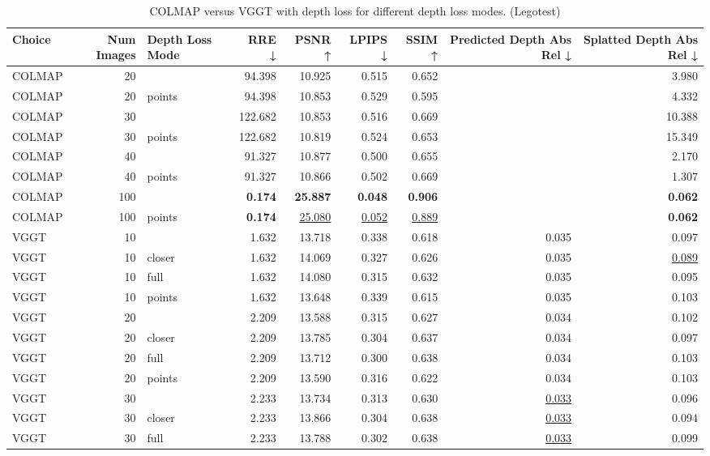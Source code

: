 \begin{table}[H]
\caption{COLMAP versus VGGT with depth loss for different depth loss modes. (Legotest)}
\label{tab:05_depth_loss_num_images_legotest}
\begin{tabular}{lrlrrrrrr}
\toprule
Choice & Num Images & Depth Loss Mode & RRE ↓ & PSNR ↑ & LPIPS ↓ & SSIM ↑ & Predicted Depth Abs Rel ↓ & Splatted Depth Abs Rel ↓ \\
\midrule
COLMAP & 20 &  & 94.398 & 10.925 & 0.515 & 0.652 &  & 3.980 \\
COLMAP & 20 & points & 94.398 & 10.853 & 0.529 & 0.595 &  & 4.332 \\
COLMAP & 30 &  & 122.682 & 10.853 & 0.516 & 0.669 &  & 10.388 \\
COLMAP & 30 & points & 122.682 & 10.819 & 0.524 & 0.653 &  & 15.349 \\
COLMAP & 40 &  & 91.327 & 10.877 & 0.500 & 0.655 &  & 2.170 \\
COLMAP & 40 & points & 91.327 & 10.866 & 0.502 & 0.669 &  & 1.307 \\
COLMAP & 100 &  & \textbf{0.174} & \textbf{25.887} & \textbf{0.048} & \textbf{0.906} &  & \textbf{0.062} \\
COLMAP & 100 & points & \textbf{0.174} & \underline{25.080} & \underline{0.052} & \underline{0.889} &  & \textbf{0.062} \\
VGGT & 10 &  & 1.632 & 13.718 & 0.338 & 0.618 & 0.035 & 0.097 \\
VGGT & 10 & closer & 1.632 & 14.069 & 0.327 & 0.626 & 0.035 & \underline{0.089} \\
VGGT & 10 & full & 1.632 & 14.080 & 0.315 & 0.632 & 0.035 & 0.095 \\
VGGT & 10 & points & 1.632 & 13.648 & 0.339 & 0.615 & 0.035 & 0.103 \\
VGGT & 20 &  & 2.209 & 13.588 & 0.315 & 0.627 & 0.034 & 0.102 \\
VGGT & 20 & closer & 2.209 & 13.785 & 0.304 & 0.637 & 0.034 & 0.097 \\
VGGT & 20 & full & 2.209 & 13.712 & 0.300 & 0.638 & 0.034 & 0.103 \\
VGGT & 20 & points & 2.209 & 13.590 & 0.316 & 0.622 & 0.034 & 0.103 \\
VGGT & 30 &  & 2.233 & 13.734 & 0.313 & 0.630 & \underline{0.033} & 0.096 \\
VGGT & 30 & closer & 2.233 & 13.866 & 0.304 & 0.638 & \underline{0.033} & 0.094 \\
VGGT & 30 & full & 2.233 & 13.788 & 0.302 & 0.638 & \underline{0.033} & 0.099 \\

\end{tabular}
\end{table}
